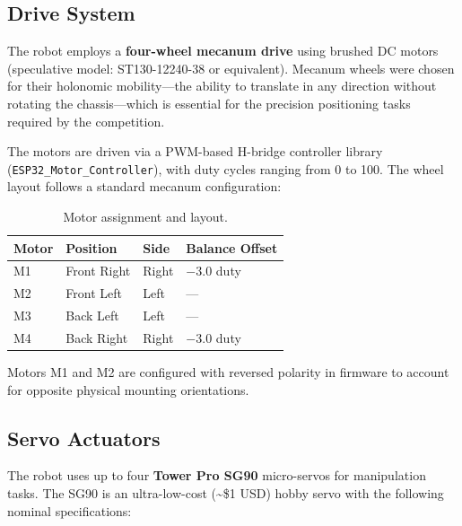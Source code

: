 \documentclass[12pt, a4paper, twoside]{article}
\begin{document}
\subsection{Drive System}

The robot employs a \textbf{four-wheel mecanum drive} using brushed DC motors (speculative model: ST130-12240-38 or equivalent). Mecanum wheels were chosen for their holonomic mobility---the ability to translate in any direction without rotating the chassis---which is essential for the precision positioning tasks required by the competition.

The motors are driven via a PWM-based H-bridge controller library (\texttt{ESP32\_Motor\_Controller}), with duty cycles ranging from 0 to 100. The wheel layout follows a standard mecanum configuration:

\begin{table}[H]
    \centering
    \caption{Motor assignment and layout.}
    \label{tab:motor-layout}
    \begin{tabular}{@{}llll@{}}
        \toprule
        \textbf{Motor} & \textbf{Position} & \textbf{Side} & \textbf{Balance Offset} \\
        \midrule
        M1 & Front Right  & Right & $-3.0$ duty \\
        M2 & Front Left   & Left  & --- \\
        M3 & Back Left    & Left  & --- \\
        M4 & Back Right   & Right & $-3.0$ duty \\
        \bottomrule
    \end{tabular}
\end{table}

\noindent Motors M1 and M2 are configured with reversed polarity in firmware to account for opposite physical mounting orientations.

\subsection{Servo Actuators}

The robot uses up to four \textbf{Tower Pro SG90} micro-servos for manipulation tasks. The SG90 is an ultra-low-cost (\textasciitilde\$1 USD) hobby servo with the following nominal specifications:
\end{document}
